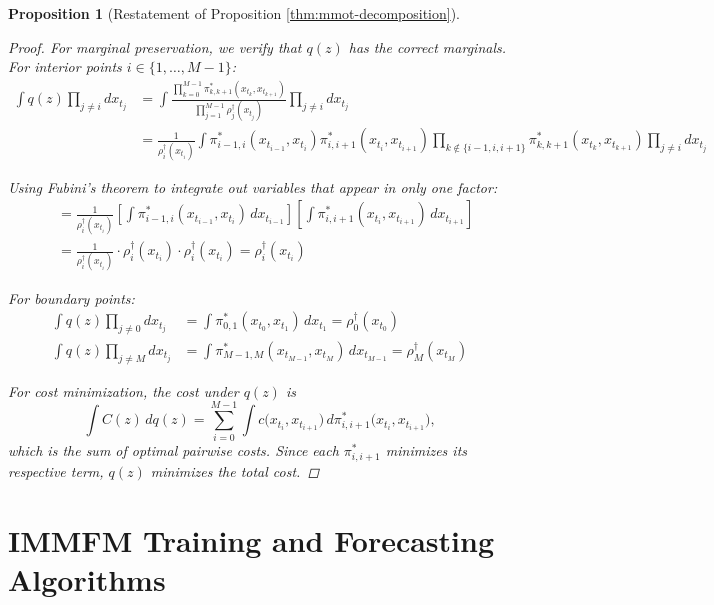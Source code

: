 \documentclass[twoside]{article}
\newtheorem*{manualproposition}{Proposition}
\begin{document}
\begin{manualproposition}[Restatement of Proposition \ref{thm:mmot-decomposition}]
\begin{proof}
For marginal preservation, we verify that $q(z)$ has the correct marginals. For interior points $i \in \{1,\ldots,M-1\}$:
\begin{align}
\int q(z) \prod_{j \neq i} dx_{t_j} &= \int \frac{\prod_{k=0}^{M-1} \pi_{k,k+1}^{*}(x_{t_k},x_{t_{k+1}})}{\prod_{j=1}^{M-1}\rho_j^{\dagger}(x_{t_j})} \prod_{j \neq i} dx_{t_j}\\
&= \frac{1}{\rho_i^{\dagger}(x_{t_i})} \int \pi_{i-1,i}^{*}(x_{t_{i-1}},x_{t_i}) \pi_{i,i+1}^{*}(x_{t_i},x_{t_{i+1}}) \prod_{k \notin \{i-1,i,i+1\}} \pi_{k,k+1}^{*}(x_{t_k},x_{t_{k+1}}) \prod_{j \neq i} dx_{t_j}
\end{align}

Using Fubini's theorem to integrate out variables that appear in only one factor:
\begin{align}
&= \frac{1}{\rho_i^{\dagger}(x_{t_i})} \left[\int \pi_{i-1,i}^{*}(x_{t_{i-1}},x_{t_i}) \, dx_{t_{i-1}}\right] \left[\int \pi_{i,i+1}^{*}(x_{t_i},x_{t_{i+1}}) \, dx_{t_{i+1}}\right]\\
&= \frac{1}{\rho_i^{\dagger}(x_{t_i})} \cdot \rho_i^{\dagger}(x_{t_i}) \cdot \rho_i^{\dagger}(x_{t_i}) = \rho_i^{\dagger}(x_{t_i})
\end{align}

For boundary points:
\begin{align}
\int q(z) \prod_{j \neq 0} dx_{t_j} &= \int \pi_{0,1}^{*}(x_{t_0},x_{t_1}) \, dx_{t_1} = \rho_0^{\dagger}(x_{t_0})\\
\int q(z) \prod_{j \neq M} dx_{t_j} &= \int \pi_{M-1,M}^{*}(x_{t_{M-1}},x_{t_M}) \, dx_{t_{M-1}} = \rho_M^{\dagger}(x_{t_M})
\end{align}

For cost minimization, the cost under $q(z)$ is
\[
\int C(z)\,dq(z)
= \sum_{i=0}^{M-1}
  \int c\bigl(x_{t_i},x_{t_{i+1}}\bigr)\,
     d\pi_{i,i+1}^{*}\bigl(x_{t_i},x_{t_{i+1}}\bigr),
\]
which is the sum of optimal pairwise costs. Since each $\pi_{i,i+1}^{*}$ minimizes its respective term, $q(z)$ minimizes the total cost.
\end{proof}
\end{manualproposition}







\section{IMMFM Training and Forecasting Algorithms}\label{app:algorithms}
\end{document}
